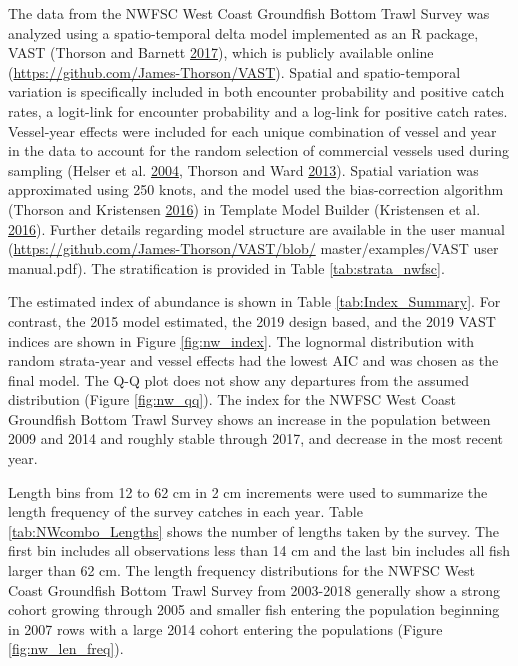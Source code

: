 \documentclass[12pt,]{article}
\begin{document}
The data from the NWFSC West Coast Groundfish Bottom Trawl Survey was
analyzed using a spatio-temporal delta model implemented as an R
package, VAST (Thorson and Barnett
\protect\hyperlink{ref-thorson_comparing_2017}{2017}), which is publicly
available online (\url{https://github.com/James-Thorson/VAST}). Spatial
and spatio-temporal variation is specifically included in both encounter
probability and positive catch rates, a logit-link for encounter
probability and a log-link for positive catch rates. Vessel-year effects
were included for each unique combination of vessel and year in the data
to account for the random selection of commercial vessels used during
sampling (Helser et al.
\protect\hyperlink{ref-helser_generalized_2004}{2004}, Thorson and Ward
\protect\hyperlink{ref-thorson_accounting_2013}{2013}). Spatial
variation was approximated using 250 knots, and the model used the
bias-correction algorithm (Thorson and Kristensen
\protect\hyperlink{ref-thorson_implementing_2016}{2016}) in Template
Model Builder (Kristensen et al.
\protect\hyperlink{ref-kristensen_tmb:_2016}{2016}). Further details
regarding model structure are available in the user manual
(\url{https://github.com/James-Thorson/VAST/blob/} master/examples/VAST
user manual.pdf). The stratification is provided in Table
\ref{tab:strata_nwfsc}.

The estimated index of abundance is shown in Table
\ref{tab:Index_Summary}. For contrast, the 2015 model estimated, the
2019 design based, and the 2019 VAST indices are shown in Figure
\ref{fig:nw_index}. The lognormal distribution with random strata-year
and vessel effects had the lowest AIC and was chosen as the final model.
The Q-Q plot does not show any departures from the assumed distribution
(Figure \ref{fig:nw_qq}). The index for the NWFSC West Coast Groundfish
Bottom Trawl Survey shows an increase in the population between 2009 and
2014 and roughly stable through 2017, and decrease in the most recent
year.

Length bins from 12 to 62 cm in 2 cm increments were used to summarize
the length frequency of the survey catches in each year. Table
\ref{tab:NWcombo_Lengths} shows the number of lengths taken by the
survey. The first bin includes all observations less than 14 cm and the
last bin includes all fish larger than 62 cm. The length frequency
distributions for the NWFSC West Coast Groundfish Bottom Trawl Survey
from 2003-2018 generally show a strong cohort growing through 2005 and
smaller fish entering the population beginning in 2007 rows with a large
2014 cohort entering the populations (Figure \ref{fig:nw_len_freq}).
\end{document}
